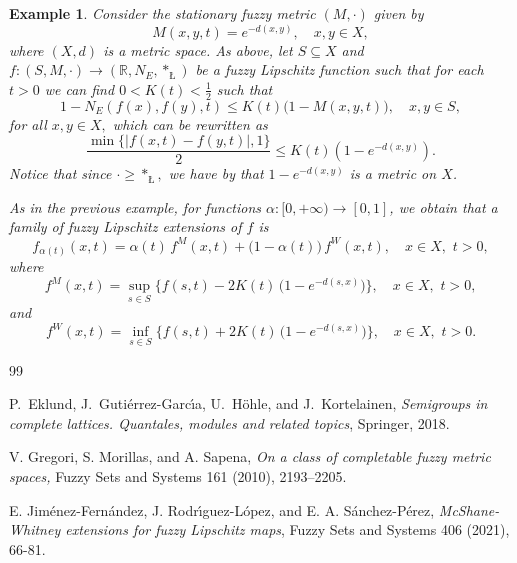 \documentclass[12pt]{amsart}
\newtheorem{example}[theorem]{Example}
\begin{document}
	\color{black}
	
	\begin{example}
		Consider the stationary fuzzy metric $(M,\cdot)$ given by 
		$$
		M(x,y,t)= e^{-d(x,y)}, \quad x, y \in X,
		$$
		where $(X,d)$ is a metric space.
		As above, let $S\subseteq X$ and $f:(S,M,\cdot)\to (\mathbb{R},N_E,\ast_{\text{\L}})$ be a fuzzy Lipschitz function such that for each $t>0$ we can find $0<K(t)<\frac{1}{2}$ such that
		$$
		1- N_E(f(x),f(y),t) \le K(t) \big( 1- M(x,y,t) \big), \quad x, y \in S,
		$$
		for all $x,y\in X,$  which can be rewritten as
		$$\frac{\min\{|f(x,t)-f(y,t)|,1\}}{2}\leq K(t)\left(1-e^{-d(x,y)}\right)\!.$$
		Notice that since $\cdot\geq \ast_{\text{\L}},$ we have by \cite[Proposition 5]{GregMoriSape10} that $1-e^{-d(x,y)}$ is a metric on $X$.
		
		As in the previous example, for functions $\alpha: [0,+\infty) \to [0,1]$, we obtain that a
		family of fuzzy Lipschitz extensions of $f$ is
		$$
		f_{\alpha(t)}(x,t) = \alpha(t) \, {{f^M}}(x,t) + \big(1-\alpha(t) \big)\, {{f^W}}(x,t), \quad x \in X, \,\, t>0,
		$$
		where
		$$
		{{f^M}}(x,t)=\sup_{s\in S} \Big\{f(s,t)-2K(t) \, \Big( 1- e^{- d(s,x)} \Big) \Big\}, \quad x \in X, \,\, t>0,
		$$
		and
		$$
		f^W(x,t)=\inf_{s\in S} \Big\{f(s,t)+2K(t) \, \Big( 1- e^{- d(s,x)} \Big) \Big\},\quad x \in X, \,\,  t>0.
		$$
	\end{example}	
	

	
	
	
	\begin{thebibliography}{99}
		
		
		
		
		P.~Eklund, J.~Guti\'errez-Garc\'{\i}a, U.~H\"ohle, and J.~Kortelainen,
		\emph{Semigroups in complete lattices. {Q}uantales, modules and related
			topics}, Springer, 2018.
		
		
		V. Gregori, S. Morillas,
		and A. Sapena, \textit{  On a class of completable fuzzy metric spaces,}  Fuzzy Sets and Systems 161 (2010), 2193--2205.
		
		 E. Jim\'enez-Fern\'andez, J. Rodr\'{\i}guez-L\'opez, and E. A. S\'anchez-P\'erez, \emph{McShane-Whitney extensions for fuzzy Lipschitz maps}, Fuzzy Sets and Systems 406 (2021), 66-81.
	\end{thebibliography}
	
\end{document}
